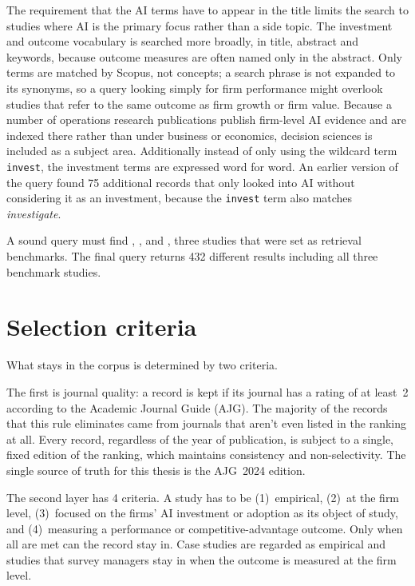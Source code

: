 \noindent The requirement that the AI terms have to appear in the title limits the search to studies where AI is the primary focus rather than a side topic. The investment and outcome vocabulary is searched more broadly, in title, abstract and keywords, because outcome measures are often named only in the abstract. Only terms are matched by Scopus, not concepts; a search phrase is not expanded to its synonyms, so a query looking simply for firm performance might overlook studies that refer to the same outcome as firm growth or firm value. Because a number of operations research publications publish firm-level AI evidence and are indexed there rather than under business or economics, decision sciences is included as a subject area. Additionally instead of only using the wildcard term \texttt{invest}, the investment terms are expressed word for word. An earlier version of the query found 75 additional records that only looked into AI without considering it as an investment, because the \texttt{invest} term also matches \emph{investigate}.

A sound query must find \textcite{babina2024artificial}, \textcite{krakowski2023artificial}, and \textcite{lui2022impact}, three studies that were set as retrieval benchmarks. The final query returns 432 different results including all three benchmark studies.

\section{Selection criteria}

What stays in the corpus is determined by two criteria.

The first is journal quality: a record is kept if its journal has a rating of at least~2 according to the Academic Journal Guide (AJG). The majority of the records that this rule eliminates came from journals that aren't even listed in the ranking at all. Every record, regardless of the year of publication, is subject to a single, fixed edition of the ranking, which maintains consistency and non-selectivity. The single source of truth for this thesis is the AJG~2024 edition.

The second layer has 4 criteria. A study has to be (1)~empirical, (2)~at the firm level, (3)~focused on the firms' AI investment or adoption as its object of study, and (4)~measuring a performance or competitive-advantage outcome. Only when all are met can the record stay in. Case studies are regarded as empirical and studies that survey managers stay in when the outcome is measured at the firm level.

